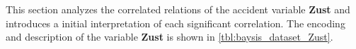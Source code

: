 This section analyzes the correlated relations of the accident variable \textbf{Zust} and introduces a initial interpretation of each significant correlation. The encoding and description of the variable \textbf{Zust} is shown in \cref{tbl:baysis_dataset_Zust}.

